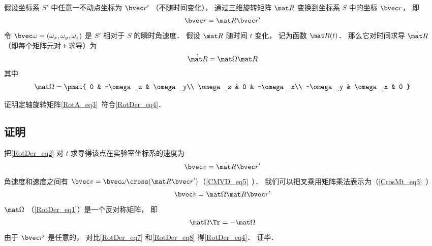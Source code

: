 

假设坐标系 $S'$ 中任意一不动点坐标为 $\bvec r'$ （不随时间变化）， 通过三维旋转矩阵 $\mat R$ 变换到坐标系 $S$ 中的坐标 $\bvec r$， 即
\begin{equation}\label{RotDer_eq2}
\bvec r = \mat R \bvec r'
\end{equation}
令 $\bvec\omega = (\omega_x, \omega_y, \omega_z)$ 是 $S'$ 相对于 $S$ 的瞬时角速度． 假设 $\mat R$ 随时间 $t$ 变化， 记为函数 $\mat R(t)$． 那么它对时间求导 $\dot{\mat R}$ （即每个矩阵元对 $t$ 求导）为
\begin{equation}\label{RotDer_eq4}
\dot{\mat R} = \mat \Omega \mat R
\end{equation}
其中
\begin{equation}\label{RotDer_eq1}
\mat \Omega = \pmat{
0 & -\omega_z & \omega_y\\
\omega_z & 0 & -\omega_x\\
-\omega_y & \omega_x & 0
}
\end{equation}

\begin{exercise}{}\label{RotDer_exe1}
证明定轴旋转矩阵\autoref{RotA_eq3}~符合\autoref{RotDer_eq4}．
\end{exercise}

\subsection{证明}
把\autoref{RotDer_eq2} 对 $t$ 求导得该点在实验室坐标系的速度为
\begin{equation}\label{RotDer_eq7}
\bvec v = \dot{\mat R} \bvec r'
\end{equation}
角速度和速度之间有 $\bvec v = \bvec \omega \cross (\mat R \bvec r')$（\autoref{CMVD_eq5}~）． 我们可以把叉乘用矩阵乘法表示为（\autoref{CrosMt_eq3}~）
\begin{equation}\label{RotDer_eq8}
\bvec v = \mat\Omega \mat R \bvec r'
\end{equation}
$\mat\Omega$ （\autoref{RotDer_eq1}）是一个反对称矩阵， 即
\begin{equation}
\mat \Omega\Tr = -\mat \Omega
\end{equation}
由于 $\bvec r'$ 是任意的， 对比\autoref{RotDer_eq7} 和\autoref{RotDer_eq8} 得\autoref{RotDer_eq4}． 证毕．
